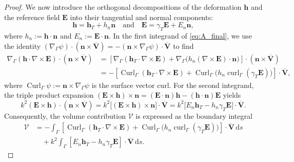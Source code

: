 \documentclass[12pt,reqno]{amsart}
\theoremstyle{definition}
\numberwithin{equation}{section}
\begin{document}
\begin{proof}
We now introduce the orthogonal decompositions of the deformation $\mathbf{h}$ and the reference field $\mathbf{E}$ into their tangential and normal components:
\[
\mathbf{h} = \mathbf{h}_T + h_n \mathbf{n} \quad \text{and} \quad \mathbf{E} = \gamma_T \mathbf{E} + E_n \mathbf{n},
\]
where $h_n := \mathbf{h} \cdot \mathbf{n}$ and $E_n := \mathbf{E} \cdot \mathbf{n}$. In the first integrand of \eqref{eq:A_final}, we use the identity $(\nabla_\Gamma \psi) \cdot (\mathbf{n} \times \overline{\mathbf{V}}) = -(\mathbf{n} \times \nabla_\Gamma \psi) \cdot \overline{\mathbf{V}}$ to find
\[
\begin{aligned}
\nabla_\Gamma (\mathbf{h} \cdot \nabla \times \mathbf{E}) \cdot (\mathbf{n} \times \overline{\mathbf{V}}) 
&= \left[ \nabla_\Gamma (\mathbf{h}_T \cdot \nabla \times \mathbf{E}) + \nabla_\Gamma \bigl( h_n (\nabla \times \mathbf{E}) \cdot \mathbf{n} \bigr) \right] \cdot (\mathbf{n} \times \overline{\mathbf{V}}) \\
&= - \left[ \operatorname{Curl}_\Gamma (\mathbf{h}_T \cdot \nabla \times \mathbf{E}) + \operatorname{Curl}_\Gamma \bigl( h_n \operatorname{curl}_\Gamma(\gamma_T \mathbf{E}) \bigr) \right] \cdot \overline{\mathbf{V}},
\end{aligned}
\]
where $\operatorname{Curl}_\Gamma \psi := \mathbf{n} \times \nabla_\Gamma \psi$ is the surface vector curl. For the second integrand, the triple product expansion $(\mathbf{E} \times \mathbf{h}) \times \mathbf{n} = (\mathbf{E} \cdot \mathbf{n})\mathbf{h} - (\mathbf{h} \cdot \mathbf{n})\mathbf{E}$ yields
\[
k^2 (\mathbf{E} \times \mathbf{h}) \cdot (\mathbf{n} \times \overline{\mathbf{V}}) 
= k^2 \bigl[ (\mathbf{E} \times \mathbf{h}) \times \mathbf{n} \bigr] \cdot \overline{\mathbf{V}} 
= k^2 \bigl[ E_n \mathbf{h}_T - h_n \gamma_T \mathbf{E} \bigr] \cdot \overline{\mathbf{V}}.
\]
Consequently, the volume contribution $\mathscr V$ is expressed as the boundary integral
\begin{equation}
\label{eq:A_final_decomposed}
\begin{aligned}
\mathscr V &= -\int_\Gamma \left[ \operatorname{Curl}_\Gamma (\mathbf{h}_T \cdot \nabla \times \mathbf{E}) + \operatorname{Curl}_\Gamma \bigl( h_n \operatorname{curl}_\Gamma(\gamma_T \mathbf{E}) \bigr) \right] \cdot \overline{\mathbf{V}} \, \mathrm{d}s \\
&\quad + k^2 \int_\Gamma \left[ E_n \mathbf{h}_T - h_n \gamma_T \mathbf{E} \right] \cdot \overline{\mathbf{V}} \, \mathrm{d}s.
\end{aligned}
\end{equation}


\end{proof}
\end{document}

